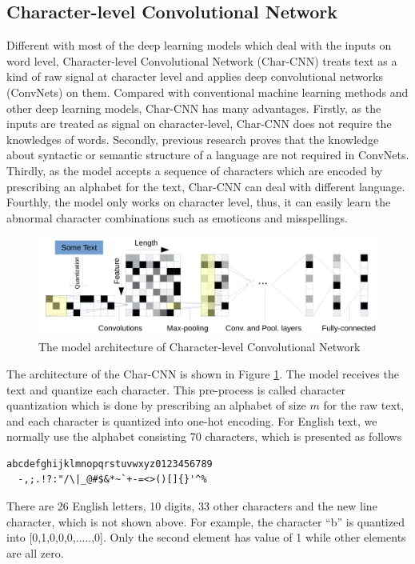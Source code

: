 \subsection{Character-level Convolutional Network}
Different with most of the deep learning models which deal with the inputs on word level, Character-level Convolutional Network (Char-CNN) treats text as a kind of raw signal at character level and applies deep convolutional networks (ConvNets) on them. Compared with conventional machine learning methods and other deep learning models, Char-CNN has many advantages. Firstly, as the inputs are treated as signal on character-level, 
Char-CNN does not require the knowledges of words. Secondly, previous research proves that the knowledge about syntactic or semantic structure of a language are not required in ConvNets. Thirdly, as the model accepts a sequence of characters which are encoded by prescribing an alphabet for the text, Char-CNN can deal with different language. Fourthly, the model only works on character level, thus, it can easily learn the abnormal character combinations such as emoticons and misspellings.

\begin{figure}
\centering
\caption{The model architecture of Character-level Convolutional Network~\cite{zhang2015character}}
\label{char_cnn}
\includegraphics{char_cnn.png}
\end{figure}

The architecture of the Char-CNN is shown in Figure \ref{char_cnn}. The model receives the text and quantize each character. This pre-process is called character quantization which is done by prescribing an alphabet of size $m$ for the raw text, and each character is quantized into one-hot encoding. For English text, we normally use the alphabet consisting 70 characters, which is presented as follows
\begin{lstlisting}[language=Tex,basicstyle = \ttfamily, breaklines = true]
  abcdefghijklmnopqrstuvwxyz0123456789
  -,;.!?:"/\|_@#$&*~`+-=<>()[]{}'^%
\end{lstlisting}
There are 26 English letters, 10 digits, 33 other characters and the new line character, which is not shown above. For example, the character ``b'' is quantized into [0,1,0,0,0,.....,0]. Only the second element has value of 1 while other elements are all zero. 

